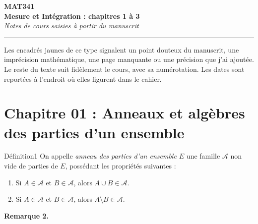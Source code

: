 \documentclass[11pt,a4paper]{article}
\newcommand{\A}{\mathscr{A}}
\begin{document}
\begin{center}
  {\Huge\bfseries\color{bleu} MAT341}\\[4pt]
  {\LARGE\bfseries\color{bleuclair} Mesure et Intégration : chapitres 1 à 3}\\[4pt]
  {\large\itshape Notes de cours saisies à partir du manuscrit}
\end{center}
\vspace{-4pt}
\hrule
\vspace{6pt}

\begin{note}
Les encadrés jaunes de ce type signalent un point douteux du manuscrit, une imprécision mathématique,
une page manquante ou une précision que j'ai ajoutée. Le reste du texte suit fidèlement le cours,
avec sa numérotation. Les dates sont reportées à l'endroit où elles figurent dans le cahier.
\end{note}

\section*{Chapitre 01 : Anneaux et algèbres des parties d'un ensemble}

\begin{enonce}{Définition}{1}
On appelle \emph{anneau des parties d'un ensemble $E$} une famille $\A$ non vide de parties de $E$,
possédant les propriétés suivantes :
\begin{enumerate}[label=\textbf{\arabic*.},leftmargin=1.2cm]
  \item Si $A\in\A$ et $B\in\A$, alors $A\cup B\in\A$.
  \item Si $A\in\A$ et $B\in\A$, alors $A\setminus B\in\A$.
\end{enumerate}
\end{enonce}

\textbf{\color{bleu}Remarque 2.}
\begin{center}
\end{center}
\begin{center}
\end{center}
\end{document}
